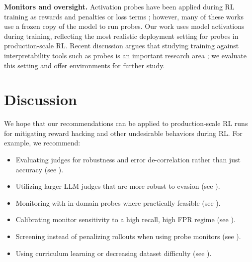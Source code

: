\documentclass{article}
\begin{document}
\textbf{Monitors and oversight.} Activation probes have been applied during RL training as rewards \citep{prasad2026features, gupta2025rlobfuscation, cundy2025lying} and penalties or loss terms \citep{obfuscationatlas}; however, many of these works use a frozen copy of the model to run probes. Our work uses model activations during training, reflecting the most realistic deployment setting for probes in production-scale RL. Recent discussion argues that studying training against interpretability tools such as probes is an important research area \citep{nanda2026modelinternals}; we evaluate this setting and offer environments for further study.

\section{Discussion}
\label{sec:discussion}

We hope that our recommendations can be applied to production-scale RL runs for mitigating reward hacking and other undesirable behaviors during RL. For example, we recommend:
\begin{itemize}[leftmargin=1em]
    \item Evaluating judges for robustness and error de-correlation rather than just accuracy (see ).
    \item Utilizing larger LLM judges that are more robust to evasion (see ).
    \item Monitoring with in-domain probes where practically feasible (see ).
    \item Calibrating monitor sensitivity to a high recall, high FPR regime (see ).
    \item Screening instead of penalizing rollouts when using probe monitors 
    (see ).
    \item Using curriculum learning or decreasing dataset difficulty (see ).
\end{itemize}
\end{document}
